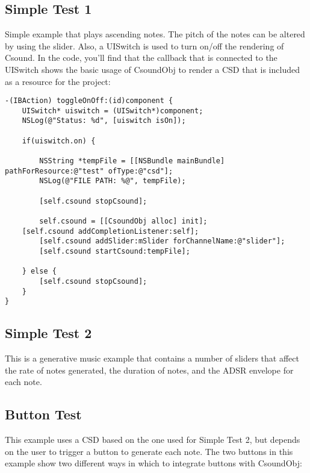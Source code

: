 \documentclass[11pt]{article}
\begin{document}
\subsection{Simple Test 1}

Simple example that plays ascending notes.  The pitch of the notes can be altered by using the slider.  Also, a UISwitch is used to turn on/off the rendering of Csound.  In the code, you'll find that the callback that is connected to the UISwitch shows the basic usage of CsoundObj to render a CSD that is included as a resource for the project:

\begin{lstlisting}[caption=Example code showing configuring and starting a CsoundObj]
-(IBAction) toggleOnOff:(id)component {
    UISwitch* uiswitch = (UISwitch*)component;
    NSLog(@"Status: %d", [uiswitch isOn]);
    
    if(uiswitch.on) {
      
        NSString *tempFile = [[NSBundle mainBundle] pathForResource:@"test" ofType:@"csd"];  
        NSLog(@"FILE PATH: %@", tempFile);
        
        [self.csound stopCsound];
        
        self.csound = [[CsoundObj alloc] init];
    [self.csound addCompletionListener:self];
        [self.csound addSlider:mSlider forChannelName:@"slider"];
        [self.csound startCsound:tempFile];
        
    } else {
        [self.csound stopCsound];
    }
}
\end{lstlisting}

\subsection{Simple Test 2}

This is a generative music example that contains a number of sliders that affect the rate of notes generated, the duration of notes, and the ADSR envelope for each note. 


\subsection{Button Test}

This example uses a CSD based on the one used for Simple Test 2, but depends on the user to trigger a button to generate each note.  The two buttons in this example show two different ways in which to integrate buttons with CsoundObj:
\end{document}
